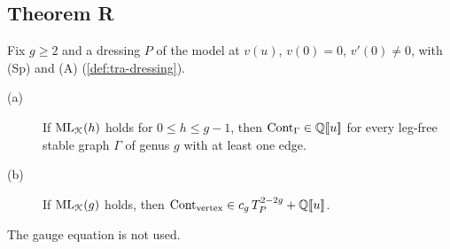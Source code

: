 \subsection{Theorem R}
\label{sec:red-thm}

\begin{thm}[Theorem R]
\label{thm:red-main}
Fix $g\geq 2$ and a dressing $P$ of the model at $v(u)$, $v(0) = 0$, $v'(0)\neq 0$, with (Sp) and (A) (\cref{def:tra-dressing}).
\begin{description}
\item[(a)] If $\mathrm{ML}_{\mathcal{K}}(h)$ holds for $0\leq h\leq g-1$, then $\mathrm{Cont}_\Gamma\in\mathbb{Q}[\![ u ]\!]$ for every leg-free stable graph $\Gamma$ of genus $g$ with at least one edge.
\item[(b)] If $\mathrm{ML}_{\mathcal{K}}(g)$ holds, then $\mathrm{Cont}_{\mathrm{vertex}}\in c_g\,T_P^{2-2g}+\mathbb{Q}[\![ u ]\!]$.
\end{description}
The gauge equation is not used.
\end{thm}

